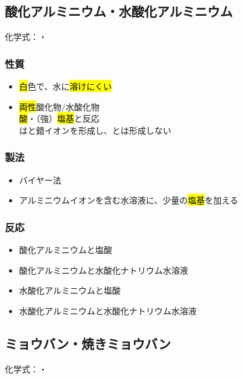 \subsection{酸化アルミニウム・水酸化アルミニウム}
化学式：\hl{}・\hl{}
\subsubsection{性質}
\begin{itemize}
  \item \hl{白}色で、水に\hl{溶けにくい}
  \item \hl{両性}酸化物/水酸化物\\
        \hl{酸}・（強）\hl{塩基}と反応\\
        は\hl{}と錯イオンを形成し、\hl{}とは形成しない
\end{itemize}
\subsubsection{製法}
\begin{itemize}
  \item バイヤー法
  \item アルミニウムイオンを含む水溶液に、少量の\hl{塩基}を加える \\
\end{itemize}
\subsubsection{反応}
\begin{itemize}
  \item 酸化アルミニウムと塩酸\\
  \item 酸化アルミニウムと水酸化ナトリウム水溶液\\
  \item 水酸化アルミニウムと塩酸\\
  \item 水酸化アルミニウムと水酸化ナトリウム水溶液\\
\end{itemize}
\subsection{ミョウバン・焼きミョウバン}
化学式：\hl{}・\hl{}
